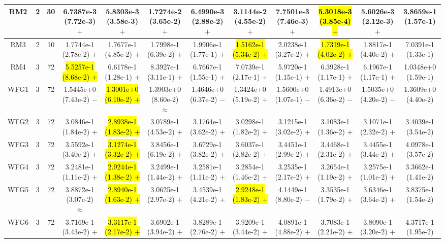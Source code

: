 \documentclass[journal]{IEEEtran}
\begin{document}
\begin{table*}[htbp]
\begin{tabular}{cccccccccccc}
\hline
\multirow{1}{*}{RM2}&2&30&6.7387e-3 (7.72e-3) $+$&5.8303e-3 (3.58e-3) $+$&1.7274e-2 (3.65e-2) $+$&6.4990e-3 (2.88e-2) $+$&3.1144e-2 (4.55e-2) $+$&7.7501e-3 (7.46e-3) $+$&\hl{5.3018e-3 (3.85e-4) $+$}&5.6026e-3 (2.12e-3) $+$&3.8659e-1 (1.57e-1)\\
\hline
\multirow{1}{*}{RM3}&2&10&1.7744e-1 (2.78e-2) $+$&1.7677e-1 (4.85e-2) $+$&1.7998e-1 (6.39e-2) $+$&1.9906e-1 (1.77e-1) $+$&\hl{1.5162e-1 (5.34e-2) $+$}&2.0238e-1 (3.27e-2) $+$&\hl{1.7319e-1 (4.02e-2) $+$}&1.8817e-1 (4.40e-2) $+$&7.0391e-1 (1.33e-1)\\
\hline
\multirow{1}{*}{RM4}&3&72&\hl{5.5257e-1 (8.68e-2) $+$}&6.6178e-1 (1.28e-1) $+$&8.3927e-1 (3.11e-1) $+$&6.7667e-1 (1.55e-1) $+$&7.0739e-1 (2.17e-1) $+$&5.9720e-1 (1.15e-1) $+$&6.3928e-1 (1.17e-1) $+$&6.1967e-1 (1.17e-1) $+$&1.0348e+0 (1.59e-1)\\
\hline
\multirow{1}{*}{WFG1}&3&72&1.5445e+0 (7.43e-2) $-$&\hl{1.3001e+0 (6.10e-2) $+$}&1.3903e+0 (8.60e-2) $\approx$&1.4646e+0 (6.37e-2) $-$&1.3424e+0 (5.19e-2) $+$&1.5600e+0 (1.07e-1) $-$&1.4913e+0 (6.36e-2) $-$&1.5035e+0 (4.20e-2) $-$&1.3609e+0 (4.40e-2)\\
\hline
\multirow{1}{*}{WFG2}&3&72&3.0846e-1 (1.84e-2) $+$&\hl{2.8938e-1 (1.83e-2) $+$}&3.0789e-1 (4.53e-2) $+$&3.1764e-1 (3.62e-2) $+$&3.0298e-1 (1.82e-2) $+$&3.1215e-1 (3.02e-2) $+$&3.1083e-1 (1.36e-2) $+$&3.1071e-1 (2.32e-2) $+$&3.4039e-1 (3.54e-2)\\
\hline
\multirow{1}{*}{WFG3}&3&72&3.5592e-1 (3.40e-2) $+$&\hl{3.1274e-1 (3.32e-2) $+$}&3.8456e-1 (6.19e-2) $+$&3.6729e-1 (3.82e-2) $+$&3.6037e-1 (2.82e-2) $+$&3.4451e-1 (2.99e-2) $+$&3.4468e-1 (2.31e-2) $+$&3.4455e-1 (3.44e-2) $+$&4.0978e-1 (3.57e-2)\\
\hline
\multirow{1}{*}{WFG4}&3&72&3.2481e-1 (1.11e-2) $+$&\hl{2.9244e-1 (1.38e-2) $+$}&3.2499e-1 (1.44e-2) $+$&3.2581e-1 (1.11e-2) $+$&3.2854e-1 (1.46e-2) $+$&3.2535e-1 (2.17e-2) $+$&3.2654e-1 (1.19e-2) $+$&3.2575e-1 (1.01e-2) $+$&3.3662e-1 (1.41e-2)\\
\hline
\multirow{1}{*}{WFG5}&3&72&3.8872e-1 (3.07e-2) $\approx$&\hl{2.8940e-1 (1.63e-2) $+$}&3.0625e-1 (2.97e-2) $+$&3.4539e-1 (4.21e-2) $+$&\hl{2.9248e-1 (1.83e-2) $+$}&4.1449e-1 (8.80e-2) $-$&3.3535e-1 (1.79e-2) $+$&3.6346e-1 (3.64e-2) $+$&3.8375e-1 (1.54e-2)\\
\hline
\multirow{1}{*}{WFG6}&3&72&3.7169e-1 (3.43e-2) $+$&\hl{3.3117e-1 (2.17e-2) $+$}&3.6902e-1 (3.94e-2) $+$&3.8289e-1 (2.76e-2) $+$&3.9209e-1 (3.44e-2) $+$&4.0891e-1 (4.88e-2) $+$&3.7083e-1 (2.21e-2) $+$&3.8090e-1 (3.20e-2) $+$&4.3717e-1 (1.95e-2)\\

\end{tabular}
\end{table*}
\end{document}
